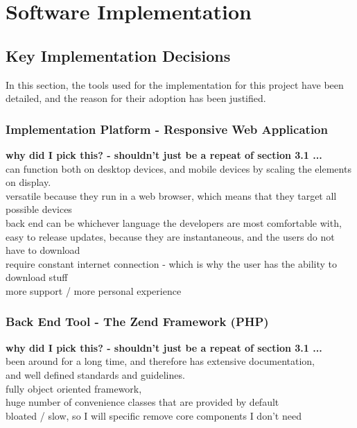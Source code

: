 \section{Software Implementation}

\subsection{Key Implementation Decisions}
\label{sec:kid}
In this section, the tools used for the implementation for this project have been detailed, and the reason for their adoption has been justified.
\subsubsection{Implementation Platform - Responsive Web Application}
{\color{red} 
	\textbf{why did I pick this? - shouldn't just be a repeat of section 3.1 ...}\\
can function both on desktop devices, and mobile devices by scaling the elements on display. \\
versatile because they run in a web browser, which means that they target all possible devices \\
back end can be whichever language the developers are most comfortable with, \\
easy to release updates, because they are instantaneous, and the users do not have to download \\
require constant internet connection - which is why the user has the ability to download stuff\\
more support / more personal experience\\
}
\subsubsection{Back End Tool - The Zend Framework (PHP)}
{\color{red} 
	\textbf{why did I pick this? - shouldn't just be a repeat of section 3.1 ...}\\
been around for a long time, and therefore has extensive documentation, \\
and well defined standards and guidelines. \\
fully object oriented framework, \\
huge number of convenience classes that are provided by default \\
bloated / slow, so I will specific remove core components I don't need\\
}

